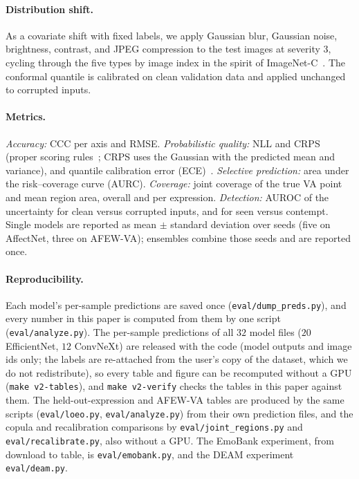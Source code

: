 \paragraph{Distribution shift.} As a covariate shift with fixed labels, we apply
Gaussian blur, Gaussian noise, brightness, contrast, and JPEG compression to the
test images at severity $3$, cycling through the five types by image index in the
spirit of ImageNet-C~\cite{hendrycks2019benchmarking}. The conformal quantile is
calibrated on clean validation data and applied unchanged to corrupted inputs.

\paragraph{Metrics.} \emph{Accuracy:} CCC per axis and RMSE.
\emph{Probabilistic quality:} NLL and CRPS (proper scoring
rules~\cite{gneiting2007strictly}; CRPS uses the Gaussian with the predicted mean
and variance), and quantile calibration error
(ECE)~\cite{kuleshov2018calibrated}. \emph{Selective prediction:} area under the
risk--coverage curve (AURC). \emph{Coverage:} joint coverage of the true VA point
and mean region area, overall and per expression. \emph{Detection:} AUROC of the
uncertainty for clean versus corrupted inputs, and for seen versus contempt.
Single models are reported as mean $\pm$ standard deviation over seeds (five
on AffectNet, three on AFEW-VA); ensembles combine those seeds and are reported
once.

\paragraph{Reproducibility.} Each model's per-sample predictions are saved once
(\texttt{eval/dump\_preds.py}), and every number in this paper is computed from
them by one script (\texttt{eval/analyze.py}). The per-sample predictions of all
$32$ model files ($20$ EfficientNet, $12$ ConvNeXt) are released with the code (model outputs and image ids only;
the labels are re-attached from the user's copy of the dataset, which we do not
redistribute), so every table and figure can be recomputed without a GPU
(\texttt{make v2-tables}), and
\texttt{make v2-verify} checks the tables in this paper against them. The
held-out-expression and AFEW-VA tables are produced by the same scripts
(\texttt{eval/loeo.py}, \texttt{eval/analyze.py}) from their own prediction
files, and the copula and recalibration comparisons by
\texttt{eval/joint\_regions.py} and \texttt{eval/recalibrate.py}, also without
a GPU. The EmoBank experiment, from download to table, is
\texttt{eval/emobank.py}, and the DEAM experiment \texttt{eval/deam.py}. \codestatement
